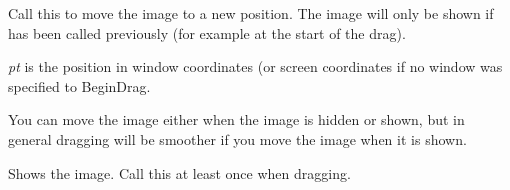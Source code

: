 
Call this to move the image to a new position. The image will only be shown if
 has been called previously (for example
at the start of the drag).

{\it pt} is the position in window coordinates (or screen coordinates if no
window was specified to BeginDrag.

You can move the image either when the image is hidden or shown, but in general dragging
will be smoother if you move the image when it is shown.

\label{wxdragimageshow}


Shows the image. Call this at least once when dragging.

